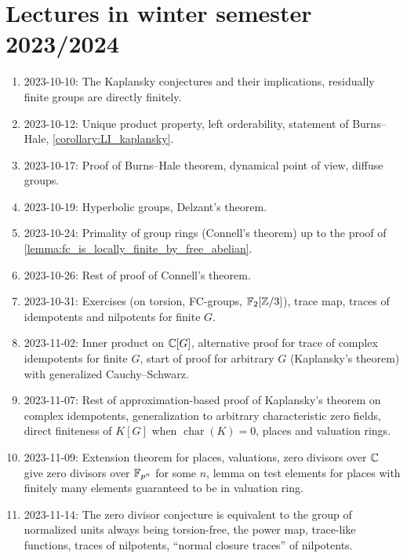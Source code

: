\chapter{Lectures in winter semester 2023/2024}

\begin{enumerate}
\item
2023-10-10: The Kaplansky conjectures and their implications, residually finite groups are directly finitely.

\item
2023-10-12: Unique product property, left orderability, statement of Burns--Hale, \cref{corollary:LI_kaplansky}.

\item
2023-10-17: Proof of Burns--Hale theorem, dynamical point of view, diffuse groups.

\item
2023-10-19: Hyperbolic groups, Delzant's theorem.

\item
2023-10-24: Primality of group rings (Connell's theorem) up to the proof of \cref{lemma:fc_is_locally_finite_by_free_abelian}.

\item
2023-10-26: Rest of proof of Connell's theorem.

\item
2023-10-31: Exercises (on torsion, FC-groups, $\mathbb{F}_2[\mathbb{Z}/3]$), trace map, traces of idempotents and nilpotents for finite $G$.

\item
2023-11-02: Inner product on $\mathbb{C}[G]$, alternative proof for trace of complex idempotents for finite $G$, start of proof for arbitrary $G$ (Kaplansky's theorem) with generalized Cauchy--Schwarz.

\item
2023-11-07: Rest of approximation-based proof of Kaplansky's theorem on complex idempotents, generalization to arbitrary characteristic zero fields, direct finiteness of $K[G]$ when $\operatorname{char}(K) = 0$, places and valuation rings.

\item
2023-11-09: Extension theorem for places, valuations, zero divisors over $\mathbb{C}$ give zero divisors over $\mathbb{F}_{p^n}$ for some $n$, lemma on test elements for places with finitely many elements guaranteed to be in valuation ring.

\item
2023-11-14: The zero divisor conjecture is equivalent to the group of normalized units always being torsion-free, the power map, trace-like functions, traces of nilpotents, ``normal closure traces'' of nilpotents.


\end{enumerate}
